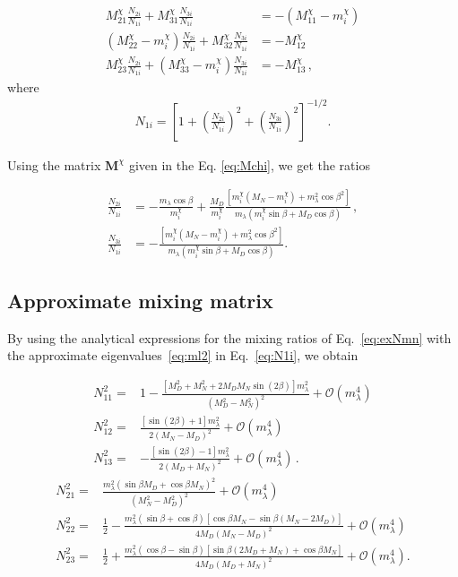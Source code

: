 \begin{align*}
{M}^{\chi}_{21}\frac{{N}_{2i}}{{N}_{1i}}+{M}^{\chi}_{31}\frac{{N}_{3i}}{{N}_{1i}}&=-({M}^{\chi}_{11}-m_i^\chi)\nonumber \\
({M}^{\chi}_{22}-m_i^\chi)\frac{{N}_{2i}}{{N}_{1i}}+{M}^{\chi}_{32}\frac{{N}_{3i}}{{N}_{1i}}&=-{M}^{\chi}_{12} \nonumber\\
{M}^{\chi}_{23}\frac{{N}_{2i}}{{N}_{1i}}+({M}^{\chi}_{33}-m_i^\chi)\frac{{N}_{3i}}{{N}_{1i}}&=-{M}^{\chi}_{13}\,,
\end{align*}
where
\begin{align}
\label{eq:N1i}
{N}_{1i}=\left[1+\left(\frac{{N}_{2i}}{{N}_{1i}}\right)^2+\left(\frac{{N}_{3i}}{{N}_{1i}}\right)^2\right]^{-1/2}.
\end{align}

Using the matrix $\textbf{M}^{\chi}$ given in the Eq. \eqref{eq:Mchi}, we get the ratios

\begin{align}
\label{eq:exNmn}
\frac{{N}_{2i}}{{N}_{1i}}
&=-\frac{m_{\lambda} \cos\beta}{m_i^\chi}+\frac{M_D}{m_i^\chi}\frac{[m_i^\chi(M_N-m_i^\chi)+m_{\lambda}^2\cos\beta^2 ]}{m_{\lambda}(m_i^\chi\sin\beta +M_D\cos\beta )}\,, \nonumber\\  
\frac{{N}_{3i}}{{N}_{1i}}
&=-\frac{[m_i^\chi(M_N-m_i^\chi)+m_{\lambda}^2 \cos\beta^2]}{m_{\lambda} (m_i^\chi\sin\beta+M_D\cos\beta)}.
\end{align}


\subsection{Approximate mixing matrix}
By using the analytical expressions for the mixing ratios of
Eq.~\eqref{eq:exNmn} with the approximate eigenvalues~\eqref{eq:ml2}
in Eq.~\eqref{eq:N1i}, we obtain

\begin{align}
N_{11}^2=& 1-\frac{\left[M_D^2+M_N^2+2M_DM_N\sin(2\beta)\right]m^2_{\lambda}}{(M_D^2-M_N^2)^2}+\mathcal{O}\left( m_{\lambda}^4 \right)\nonumber\\
N_{12}^2 =&   \frac{[\sin (2 \beta )+1] m_{\lambda }^2}{2 \left(M_N-M_D\right)^2}+\mathcal{O}\left( m_{\lambda}^4 \right)\nonumber\\
N_{13}^2=&  -\frac{[\sin (2 \beta )-1] m_{\lambda }^2}{2 \left(M_D+M_N\right)^2}+\mathcal{O}\left( m_{\lambda}^4 \right)\,.
\end{align}
\begin{align}
N_{21}^2=&\frac{m_{\lambda }^2 \left(\sin\beta  M_D+\cos\beta
   M_N\right)^2}{\left(M_N^2-M_D^2\right)^2}+\mathcal{O}\left( m_{\lambda}^4 \right)\nonumber\\
N_{22}^2=&\frac{1}{2}-\frac{m_{\lambda }^2 (\sin\beta+\cos\beta) \left[\cos\beta M_N-\sin\beta  \left(M_N-2 M_D\right)\right]}{4 M_D \left(M_N-M_D\right)^2}+\mathcal{O}\left( m_{\lambda}^4 \right)\nonumber\\
   N_{23}^2=&\frac{1}{2}+\frac{m_{\lambda }^2 (\cos\beta-\sin\beta) \left[\sin\beta \left(2
   M_D+M_N\right)+\cos\beta M_N\right]}{4 M_D \left(M_D+M_N\right)^2}+\mathcal{O}\left( m_{\lambda}^4 \right).
\end{align}

